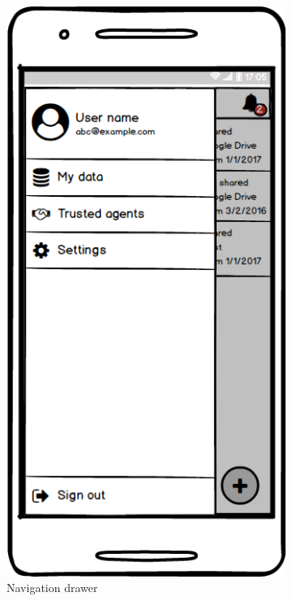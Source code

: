 \documentclass[conference]{IEEEtran}
\begin{document}
\begin{figure}[t]
	\begin{subfigure}{0.24\textwidth}
	\includegraphics[width=0.95\linewidth]{screen3.png}
	\caption{Navigation drawer}
	\label{fig:screen3}
	\end{subfigure}
	\begin{subfigure}{0.24\textwidth}

\end{subfigure}
\end{figure}
\end{document}
